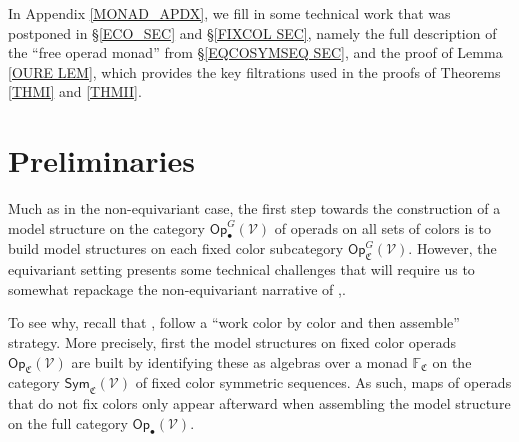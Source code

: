 \documentclass[a4paper,10pt
,draft
]{article}%
\numberwithin{equation}{section}
\numberwithin{figure}{section}
\theoremstyle{definition} %
\newcommand{\Op}{\mathsf{Op}}%
\newcommand{\V}{\ensuremath{\mathcal V}}
\newcommand{\1}{\ensuremath{\mathbbm 1}}%
\begin{document}


In Appendix \ref{MONAD_APDX},
we fill in some technical work that was postponed in \S \ref{ECO_SEC} and \S \ref{FIXCOL SEC},
namely the full description of the ``free operad monad''
from \S \ref{EQCOSYMSEQ SEC},
and the proof of Lemma \ref{OURE LEM},
which provides the key filtrations used in the proofs of
Theorems \ref{THMI} and \ref{THMII}.
 




\section{Preliminaries}\label{PRE SEC}


Much as in the non-equivariant case,
the first step towards the
construction of a model structure on the category $\Op_\bullet^G(\V)$ of operads on all sets of colors
is to build model structures on each 
fixed color subcategory $\Op_{\mathfrak C}^G(\V)$.
However, the equivariant setting presents some technical challenges that will 
require us to somewhat repackage the non-equivariant narrative of
\cite{CM13b},\cite{Cav}.



To see why, recall that \cite{CM13b},\cite{Cav}
follow a ``work color by color and then assemble'' strategy.
More precisely, first the model structures on fixed color operads 
$\mathsf{Op}_{\mathfrak{C}}(\V)$
are built by identifying these as algebras over a monad
$\mathbb{F}_{\mathfrak{C}}$
on the category $\mathsf{Sym}_{\mathfrak{C}}(\V)$
of fixed color symmetric sequences.
As such, maps of operads that do not fix colors
only appear afterward when assembling the model structure on the full category $\mathsf{Op}_{\bullet}(\V)$.
\end{document}
